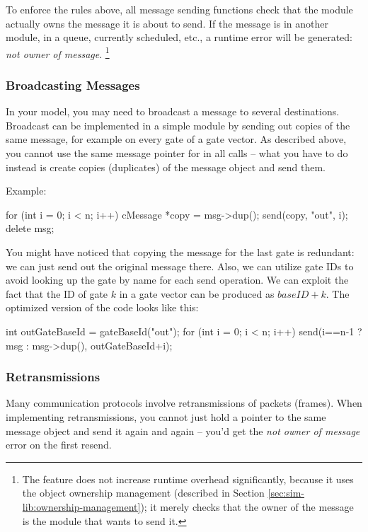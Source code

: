 To enforce the rules above, all message sending functions check that the
module actually owns the message it is about to send. If the message is in
another module, in a queue, currently scheduled, etc., a runtime error
will be generated: \textit{not owner of message}.
  \footnote{The feature does not increase runtime overhead significantly, because
  it uses the object ownership management (described in
  Section \ref{sec:sim-lib:ownership-management});
  it merely checks that the owner of the message is the module that
  wants to send it.}


\subsubsection{Broadcasting Messages}
\label{sec:simple-modules:broadcasting-messages}

In your model, you may need to broadcast a message to several destinations.
Broadcast can be implemented in a simple module by sending out copies
of the same message, for example on every gate of a gate vector.
As described above, you cannot use the same message pointer for
in all  calls -- what you have to do instead is
create copies (duplicates) of the message object and send them.

Example:

\begin{cpp}
for (int i = 0; i < n; i++)
{
    cMessage *copy = msg->dup();
    send(copy, "out", i);
}
delete msg;
\end{cpp}

You might have noticed that copying the message for the last gate is
redundant: we can just send out the original message there.
Also, we can utilize gate IDs to avoid looking up the gate by name
for each send operation. We can exploit the fact that the ID of gate
$k$ in a gate vector can be produced as ${baseID} + k$.
The optimized version of the code looks like this:

\begin{cpp}
int outGateBaseId = gateBaseId("out");
for (int i = 0; i < n; i++)
    send(i==n-1 ? msg : msg->dup(), outGateBaseId+i);
\end{cpp}


\subsubsection{Retransmissions}
\label{sec:simple-modules:retransmissions}

Many communication protocols involve retransmissions of packets (frames).
When implementing retransmissions, you cannot just hold a pointer
to the same message object and send it again and again -- you'd get
the \textit{not owner of message} error on the first resend.

